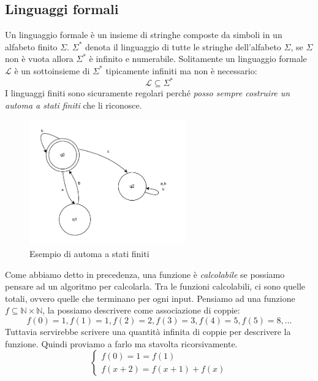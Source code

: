 \documentclass[a4paper]{article}
\begin{document}
\subsection{Linguaggi formali}
{
    Un linguaggio formale è un insieme di stringhe composte da simboli in un alfabeto finito $\Sigma$.
}
\noindent
$\Sigma^*$ denota il linguaggio di tutte le stringhe dell'alfabeto $\Sigma$, se $\Sigma$ non è vuota allora $\Sigma^*$ è 
infinito e numerabile.
Solitamente un linguaggio formale $\mathcal{L}$ è un sottoinsieme di $\Sigma^*$ tipicamente infiniti ma non è necessario:
\[\mathcal{L} \subseteq \Sigma^*\]
I linguaggi finiti sono sicuramente regolari perché \textit{posso sempre costruire un automa a stati finiti} che li riconosce.

\begin{figure}[H]
    \centering
\end{figure}


\begin{figure}[H]
    \centering
    \includegraphics[width=0.6\textwidth]{automa.pdf}
    \caption{Esempio di automa a stati finiti}
\end{figure}
\noindent
Come abbiamo detto in precedenza, una funzione è \textit{calcolabile}
se possiamo pensare ad un algoritmo per calcolarla.
Tra le funzioni calcolabili, ci sono quelle totali, ovvero quelle che terminano per ogni input.
\ex{}
{
    Pensiamo ad una funzione $f \subseteq \mathbb{N} \times \mathbb{N}$,
    la possiamo descrivere come associazione di coppie:
    \[f(0) = 1, f(1) = 1, f(2) = 2, f(3) = 3, f(4) = 5, f(5) = 8, \dots\]
    Tuttavia servirebbe scrivere una quantità infinita di coppie per descrivere la funzione.
    Quindi proviamo a farlo ma stavolta ricorsivamente.
    \[
    \begin{cases}
        f(0) = 1 = f(1)\\
        f(x+2) = f(x+1) + f(x)
    \end{cases}
    \]
}
\end{document}
